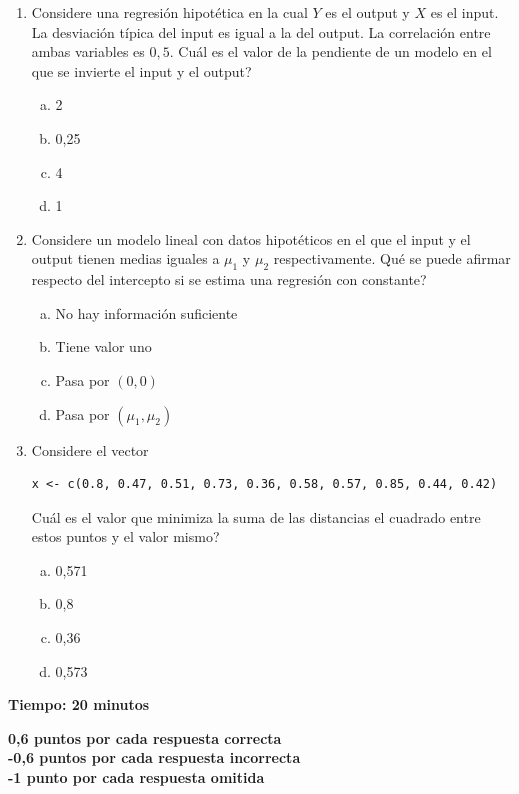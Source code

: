 \documentclass[11pt,oneside,spanish]{article}
\theoremstyle{definition}
\theoremstyle{definition}\newtheorem{definicion}{Definicin}
\theoremstyle{definition}\newtheorem{ejemplo}{Ejemplo}
\theoremstyle{remark}\newtheorem{nota}{\textsc{Nota}}
\theoremstyle{definition}\newtheorem{proposicion}{Proposicin}
\theoremstyle{definition}\newtheorem{problema}{Problema}
\begin{document}
\begin{enumerate}[(1)]
\item Considere una regresi\'on hipot\'etica en la cual $Y$ es el output y $X$ es el input. La desviaci\'on t\'ipica del input es igual a la del output. La correlaci\'on entre ambas variables es $0,5$. {\textquestiondown}Cu\'al es el valor de la pendiente de un modelo en el que se invierte el input y el output?
	\begin{enumerate}[(a)]
	\item 2
	\item 0,25
	\item 4
	\item 1
	\end{enumerate}
		
\item Considere un modelo  lineal con datos hipot\'eticos en el que el input y el output tienen medias iguales a $\mu_1$ y $\mu_2$ respectivamente. {\textquestiondown}Qu\'e se puede afirmar respecto del intercepto si se estima una regresi\'on con constante?		
	\begin{enumerate}[(a)]
	\item No hay informaci\'on suficiente
	\item Tiene valor uno
	\item Pasa por $(0,0)$
	\item Pasa por $(\mu_1,\mu_2)$
	\end{enumerate}	

\newpage

\item Considere el vector
\begin{lstlisting}[backgroundcolor=\color{Gray!20},frame=none,basicstyle=\ttfamily]
 x <- c(0.8, 0.47, 0.51, 0.73, 0.36, 0.58, 0.57, 0.85, 0.44, 0.42)
\end{lstlisting}
{\textquestiondown}Cu\'al es el valor que minimiza la suma de las distancias el cuadrado entre estos puntos y el valor mismo?
	\begin{enumerate}[(a)]
	\item 0,571
	\item 0,8
	\item 0,36
	\item 0,573
	\end{enumerate}

\end{enumerate}

\bigskip

\textbf{Tiempo: 20 minutos}

\medskip

\textbf{0,6 puntos por cada respuesta correcta}\\
\textbf{-0,6 puntos por cada respuesta incorrecta}\\
\textbf{-1 punto por cada respuesta omitida}
\end{document}
